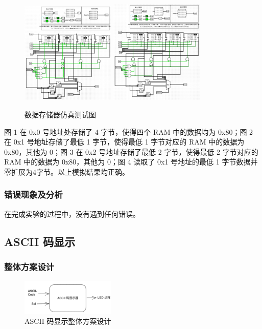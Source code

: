 \documentclass{article}
\begin{document}
    \begin{figure}[H]
    \centering
    \includegraphics[width=0.4\textwidth]{1.5.3.png}  
    \includegraphics[width=0.4\textwidth]{1.5.4.png}
    \caption{数据存储器仿真测试图}
    \end{figure}
    图 1 在 0x0 号地址处存储了 4 字节，使得四个 RAM 中的数据均为 0x80；图 2 在 0x1 号地址存储了最低 1 字节，使得最低 1 字节对应的 RAM 中的数据为 0x80，其他为 0；图 3 在 0x2 号地址存储了最低 2 字节，使得最低 2 字节对应的 RAM 中的数据为 0x80，其他为 0；图 4 读取了 0x1 号地址的最低 1 字节数据并零扩展为4字节。以上模拟结果均正确。
    
    

    \subsubsection{错误现象及分析}
    在完成实验的过程中，没有遇到任何错误。

    \subsection{ASCII 码显示}

    \subsubsection{整体方案设计}
    \begin{figure}[H]
    \centering
    \includegraphics[width=0.4\textwidth]{2.1.png}
    \caption{ASCII 码显示整体方案设计}
    \end{figure}
\end{document}
